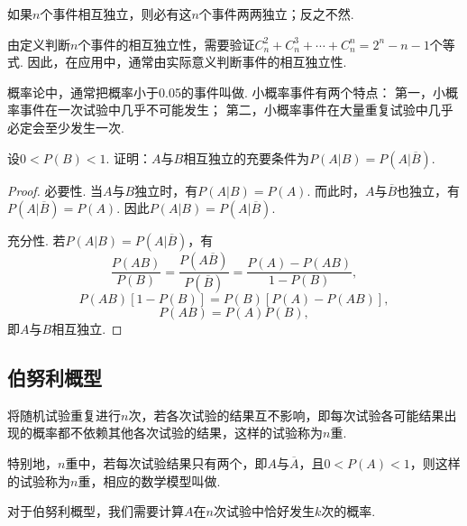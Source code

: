 \begin{theorem}
如果\(n\)个事件相互独立，则必有这\(n\)个事件两两独立；反之不然.
\end{theorem}

由定义判断\(n\)个事件的相互独立性，需要验证\(C_n^2+C_n^3+\dotsb+C_n^n=2^n-n-1\)个等式.
因此，在应用中，通常由实际意义判断事件的相互独立性.

概率论中，通常把概率小于0.05的事件叫做.
小概率事件有两个特点：
第一，小概率事件在一次试验中几乎不可能发生；
第二，小概率事件在大量重复试验中几乎必定会至少发生一次.

\begin{example}
设\(0<P(B)<1\).
证明：\(A\)与\(B\)相互独立的充要条件为\(P(A \vert B) = P(A \vert \overline{B})\).
\begin{proof}
必要性.
当\(A\)与\(B\)独立时，有\(P(A \vert B) = P(A)\).
而此时，\(A\)与\(\overline{B}\)也独立，有\(P(A \vert \overline{B}) = P(A)\).
因此\(P(A \vert B) = P(A \vert \overline{B})\).

充分性.
若\(P(A \vert B) = P(A \vert \overline{B})\)，有\[
\frac{P(AB)}{P(B)}
= \frac{P(A\overline{B})}{P(\overline{B})}
= \frac{P(A)-P(AB)}{1-P(B)},
\]\[
P(AB) [1-P(B)] = P(B) [P(A)-P(AB)],
\]\[
P(AB) = P(A) P(B),
\]即\(A\)与\(B\)相互独立.
\end{proof}
\end{example}

\subsection{伯努利概型}
\begin{definition}
将随机试验重复进行\(n\)次，若各次试验的结果互不影响，即每次试验各可能结果出现的概率都不依赖其他各次试验的结果，这样的试验称为\(n\)重.

特别地，\(n\)重中，若每次试验结果只有两个，即\(A\)与\(\overline{A}\)，且\(0 < P(A) < 1\)，则这样的试验称为\(n\)重，相应的数学模型叫做.
\end{definition}

对于伯努利概型，我们需要计算\(A\)在\(n\)次试验中恰好发生\(k\)次的概率.

